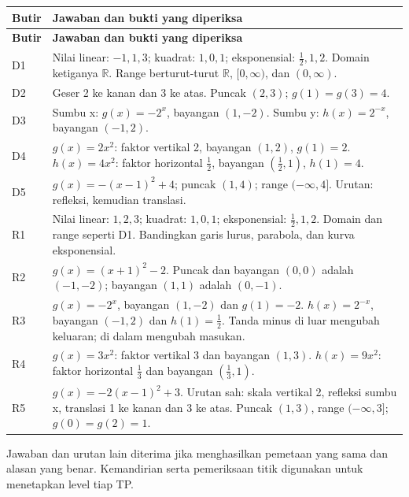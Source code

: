 \documentclass[11pt,a4paper]{article}
\begin{document}
{\small\setlength{\tabcolsep}{2mm}\renewcommand{\arraystretch}{1.35}\begin{longtable}{|>{\raggedright\arraybackslash}p{14.685mm}|>{\raggedright\arraybackslash}p{154.865mm}|}\hline
\rowcolor{gray!10}\textbf{Butir} & \textbf{Jawaban dan bukti yang diperiksa}\\ \hline
\endfirsthead
\rowcolor{gray!10}\textbf{Butir} & \textbf{Jawaban dan bukti yang diperiksa}\\ \hline
\endhead
D1 & Nilai linear: \(-1,1,3\); kuadrat: \(1,0,1\); eksponensial: \(\frac12,1,2\). Domain ketiganya \(\mathbb R\). Range berturut-turut \(\mathbb R\), \([0,\infty)\), dan \((0,\infty)\).\\ \hline
D2 & Geser 2 ke kanan dan 3 ke atas. Puncak \((2,3)\); \(g(1)=g(3)=4\).\\ \hline
D3 & Sumbu x: \(g(x)=-2^x\), bayangan \((1,-2)\). Sumbu y: \(h(x)=2^{-x}\), bayangan \((-1,2)\).\\ \hline
D4 & \(g(x)=2x^2\): faktor vertikal 2, bayangan \((1,2)\), \(g(1)=2\). \(h(x)=4x^2\): faktor horizontal \(\frac12\), bayangan \(\left(\frac12,1\right)\), \(h(1)=4\).\\ \hline
D5 & \(g(x)=-(x-1)^2+4\); puncak \((1,4)\); range \((-\infty,4]\). Urutan: refleksi, kemudian translasi.\\ \hline
R1 & Nilai linear: \(1,2,3\); kuadrat: \(1,0,1\); eksponensial: \(\frac12,1,2\). Domain dan range seperti D1. Bandingkan garis lurus, parabola, dan kurva eksponensial.\\ \hline
R2 & \(g(x)=(x+1)^2-2\). Puncak dan bayangan \((0,0)\) adalah \((-1,-2)\); bayangan \((1,1)\) adalah \((0,-1)\).\\ \hline
R3 & \(g(x)=-2^x\), bayangan \((1,-2)\) dan \(g(1)=-2\). \(h(x)=2^{-x}\), bayangan \((-1,2)\) dan \(h(1)=\frac12\). Tanda minus di luar mengubah keluaran; di dalam mengubah masukan.\\ \hline
R4 & \(g(x)=3x^2\): faktor vertikal 3 dan bayangan \((1,3)\). \(h(x)=9x^2\): faktor horizontal \(\frac13\) dan bayangan \(\left(\frac13,1\right)\).\\ \hline
R5 & \(g(x)=-2(x-1)^2+3\). Urutan sah: skala vertikal 2, refleksi sumbu x, translasi 1 ke kanan dan 3 ke atas. Puncak \((1,3)\), range \((-\infty,3]\); \(g(0)=g(2)=1\).\\ \hline
\end{longtable}}\medskip
{\small Jawaban dan urutan lain diterima jika menghasilkan pemetaan yang sama dan alasan yang benar. Kemandirian serta pemeriksaan titik digunakan untuk menetapkan level tiap TP.\par}\medskip
\end{document}
